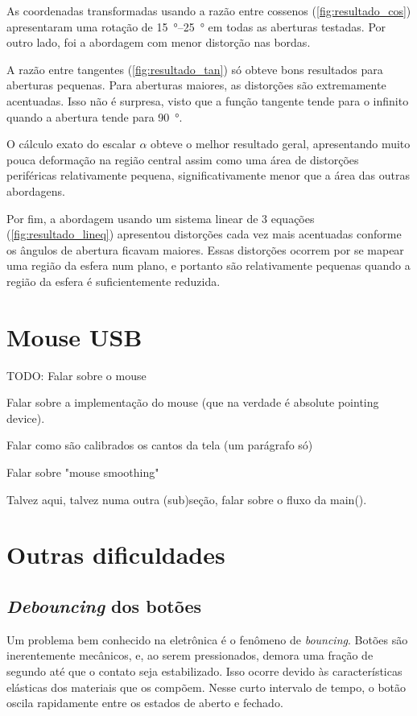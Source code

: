 \documentclass[brazil,pagestart=firstchapter]{abnt}
\begin{document}
As coordenadas transformadas usando a razão entre cossenos
(\ref{fig:resultado_cos}) apresentaram uma rotação de
\SIrange{15}{25}{\degree} em todas as aberturas testadas. Por outro lado,
foi a abordagem com menor distorção nas bordas.

A razão entre tangentes (\ref{fig:resultado_tan}) só obteve bons resultados
para aberturas pequenas. Para aberturas maiores, as distorções são
extremamente acentuadas. Isso não é surpresa, visto que a função tangente
tende para o infinito quando a abertura tende para \SI{90}{\degree}.

O cálculo exato do escalar $\alpha$ obteve o melhor resultado geral,
apresentando muito pouca deformação na região central assim como uma área de
distorções periféricas relativamente pequena, significativamente menor que a
área das outras abordagens.

Por fim, a abordagem usando um sistema linear de 3 equações
(\ref{fig:resultado_lineq}) apresentou distorções cada vez mais acentuadas
conforme os ângulos de abertura ficavam maiores. Essas distorções ocorrem
por se mapear uma região da esfera num plano, e portanto são relativamente
pequenas quando a região da esfera é suficientemente reduzida.


\section{Mouse USB} \label{sec:mouse}

TODO: Falar sobre o mouse

Falar sobre a implementação do mouse (que na verdade é absolute pointing
device).

Falar como são calibrados os cantos da tela (um parágrafo só)

Falar sobre "mouse smoothing"

Talvez aqui, talvez numa outra (sub)seção, falar sobre o fluxo da main().


\section{Outras dificuldades}
\label{sec:outras_dificuldades}


\subsection{\textit{Debouncing} dos botões}
\label{sec:debouncing}

Um problema bem conhecido na eletrônica é o fenômeno de \textit{bouncing}.
Botões são inerentemente mecânicos, e, ao serem pressionados, demora uma
fração de segundo até que o contato seja estabilizado. Isso ocorre devido às
características elásticas dos materiais que os compõem. Nesse curto
intervalo de tempo, o botão oscila rapidamente entre os estados de aberto e
fechado.
\end{document}
